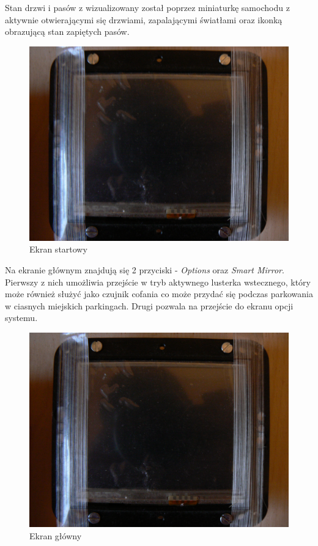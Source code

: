 \documentclass{xmgr}
\begin{document}
Stan drzwi i pasów z wizualizowany został poprzez miniaturkę samochodu z aktywnie otwierającymi się drzwiami, zapalającymi światłami oraz ikonką obrazującą stan zapiętych pasów.

\begin{figure}[!h]
    \centering
    	\includegraphics[height=0.3\textheight]{images/start.JPG}
    \caption{Ekran startowy}
\end{figure} 

Na ekranie głównym znajdują się 2 przyciski - \emph{Options} oraz \emph{Smart Mirror}. Pierwszy z nich umożliwia przejście w tryb aktywnego lusterka wstecznego, który może również służyć jako czujnik cofania co może przydać się podczas parkowania w ciasnych miejskich parkingach. Drugi pozwala na przejście do ekranu opcji systemu. 

\begin{figure}[!h]
    \centering
    	\includegraphics[height=0.3\textheight]{images/mainScreen.JPG}
    \caption{Ekran główny}
\end{figure}
\end{document}
